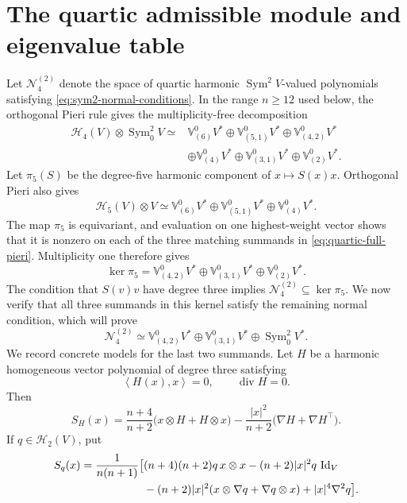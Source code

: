 \documentclass[reqno,11pt]{amsart}
\theoremstyle{definition}
\newcommand{\Sym}{\operatorname{Sym}}
\newcommand{\Id}{\operatorname{Id}}
\newcommand{\Harm}{\mathscr H}
\newcommand{\inner}[2]{\left\langle #1,#2\right\rangle}
\begin{document}
\section{The quartic admissible module and eigenvalue table}\label{app:quartic-module}

Let $\mathscr N^{(2)}_4$ denote the space of quartic harmonic
$\Sym^2V$-valued polynomials satisfying
\eqref{eq:sym2-normal-conditions}. In the range $n\geq12$ used below, the
orthogonal Pieri rule gives the multiplicity-free decomposition
\begin{equation}\label{eq:quartic-full-pieri}
\begin{split}
 \Harm_4(V)\otimes\Sym^2_0V
 \simeq{}&
 \mathbb V^0_{(6)}V^*\oplus\mathbb V^0_{(5,1)}V^*
 \oplus\mathbb V^0_{(4,2)}V^*\\
 &\oplus\mathbb V^0_{(4)}V^*
 \oplus\mathbb V^0_{(3,1)}V^*
 \oplus\mathbb V^0_{(2)}V^*.
\end{split}
\end{equation}
Let $\pi_5(S)$ be the degree-five harmonic component of
$x\mapsto S(x)x$. Orthogonal Pieri also gives
$$
 \Harm_5(V)\otimes V
 \simeq
 \mathbb V^0_{(6)}V^*\oplus\mathbb V^0_{(5,1)}V^*
 \oplus\mathbb V^0_{(4)}V^*.
$$
The map $\pi_5$ is equivariant, and evaluation on one highest-weight vector
shows that it is nonzero on each of the three matching summands in
\eqref{eq:quartic-full-pieri}. Multiplicity one therefore gives
$$
 \ker\pi_5
 =\mathbb V^0_{(4,2)}V^*
 \oplus\mathbb V^0_{(3,1)}V^*
 \oplus\mathbb V^0_{(2)}V^*.
$$
The condition that $S(v)v$ have degree three implies
$\mathscr N^{(2)}_4\subseteq\ker\pi_5$. We now verify that all three summands
in this kernel satisfy the remaining normal condition, which will prove
\begin{equation}\label{eq:quartic-decomposition}
 \mathscr N^{(2)}_4
 \simeq
 \mathbb V^0_{(4,2)}V^*
 \oplus\mathbb V^0_{(3,1)}V^*
 \oplus\Sym^2_0V^*.
\end{equation}
We record concrete models for the last two summands.  Let $H$ be a harmonic
homogeneous vector polynomial of degree three satisfying
\begin{equation*}
  \inner{H(x)}x=0,
  \qquad
  \operatorname{div}H=0.
\end{equation*}
Then
\begin{equation}\label{eq:SH-embedding}
 S_H(x)=\frac{n+4}{n+2}
 \bigl(x\otimes H+H\otimes x\bigr)
 -\frac{|x|^2}{n+2}
 \bigl(\nabla H+\nabla H^\top\bigr).
\end{equation}
If $q\in\Harm_2(V)$, put
\begin{align}
 S_q(x)=\frac1{n(n+1)}\bigl[&
 (n+4)(n+2)q\,x\otimes x-(n+2)|x|^2q\,\Id_V\notag\\
 &-(n+2)|x|^2
 (x\otimes\nabla q+\nabla q\otimes x)
 +|x|^4\nabla^2q\bigr].
 \label{eq:Sq-embedding}
\end{align}
\end{document}
